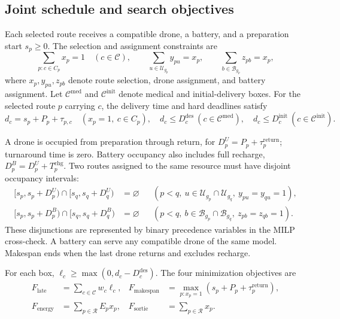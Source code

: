 \documentclass[11pt,a4paper]{article}
\begin{document}
\subsection{Joint schedule and search objectives}
Each selected route receives a compatible drone, a battery, and a preparation start $s_p\ge0$. The selection and assignment constraints are
\begin{equation}
\sum_{p:c\in C_p}x_p=1\quad(c\in\mathcal C),\qquad
\sum_{u\in\mathcal U_{g_p}}y_{pu}=x_p,\qquad
\sum_{b\in\mathcal B_{g_p}}z_{pb}=x_p,
\label{eq:q2-cover}
\end{equation}
where $x_p,y_{pu},z_{pb}$ denote route selection, drone assignment, and battery assignment. Let $\mathcal C^{\mathrm{med}}$ and $\mathcal C^{\mathrm{init}}$ denote medical and initial-delivery boxes. For the selected route $p$ carrying $c$, the delivery time and hard deadlines satisfy
\begin{equation}
d_c=s_p+P_p+\tau_{p,c}\quad(x_p=1,\ c\in C_p),\quad d_c\le D_c^{\mathrm{des}}\ (c\in\mathcal C^{\mathrm{med}}),\quad d_c\le D_c^{\mathrm{init}}\ (c\in\mathcal C^{\mathrm{init}}).
\label{eq:q2-deadlines}
\end{equation}
\begin{samepage}
A drone is occupied from preparation through return, for $D_p^U=P_p+\tau_p^{\mathrm{return}}$; turnaround time is zero. Battery occupancy also includes full recharge, $D_p^B=D_p^U+T_p^{\mathrm{chg}}$. Two routes assigned to the same resource must have disjoint occupancy intervals:
\begin{align}
[s_p,s_p+D_p^U)\cap[s_q,s_q+D_q^U)&=\varnothing &&(p<q,\ u\in\mathcal U_{g_p}\cap\mathcal U_{g_q},\ y_{pu}=y_{qu}=1),\label{eq:q2-drone-nonoverlap}\\
[s_p,s_p+D_p^B)\cap[s_q,s_q+D_q^B)&=\varnothing &&(p<q,\ b\in\mathcal B_{g_p}\cap\mathcal B_{g_q},\ z_{pb}=z_{qb}=1).\label{eq:q2-battery-nonoverlap}
\end{align}
These disjunctions are represented by binary precedence variables in the MILP cross-check. A battery can serve any compatible drone of the same model. Makespan ends when the last drone returns and excludes recharge.\end{samepage}
For each box, $\ell_c\ge\max(0,d_c-D_c^{\mathrm{des}})$. The four minimization objectives are
\begin{align}
F_{\mathrm{late}}&=\sum_{c\in\mathcal C}w_c\ell_c, &
F_{\mathrm{makespan}}&=\max_{p:x_p=1}(s_p+P_p+\tau_p^{\mathrm{return}}),\\
F_{\mathrm{energy}}&=\sum_{p\in\mathcal R}E_px_p, &
F_{\mathrm{sortie}}&=\sum_{p\in\mathcal R}x_p.
\label{eq:q2-objectives}
\end{align}
\end{document}
